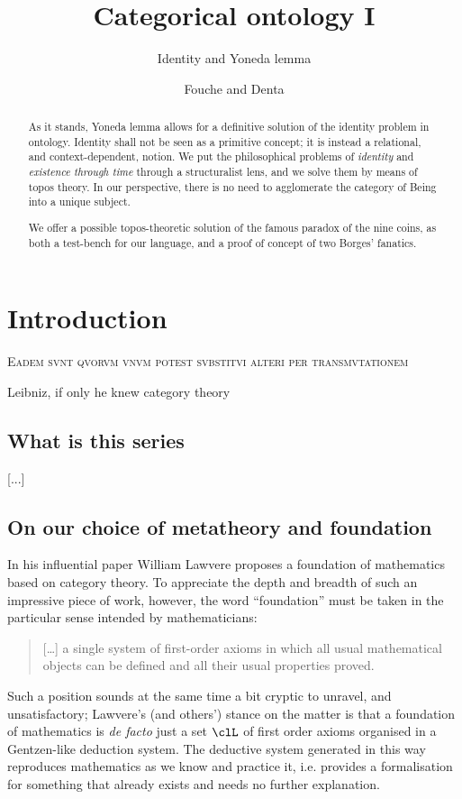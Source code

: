 \documentclass{amsart}
\author{Fouche and Denta}
\title{Categorical ontology I}
\subtitle{Identity and Yoneda lemma}
\begin{document}
\maketitle
\begin{abstract}
  As it stands, Yoneda lemma allows for a definitive solution of the identity problem in ontology. Identity shall not be seen as a primitive concept; it is instead a relational, and context-dependent, notion. We put the philosophical problems of \emph{identity} and \emph{existence through time} through a structuralist lens, and we solve them by means of topos theory. In our perspective, there is no need to agglomerate the category of Being into a unique subject.
  
  We offer a possible topos-theoretic solution of the famous paradox of the nine coins, as both a test-bench for our language, and a proof of concept of two Borges' fanatics.
\end{abstract}
\section{Introduction}
\epigraph{\textsc{Eadem svnt qvorvm vnvm potest svbstitvi alteri per transmvtationem}}{Leibniz, if only he knew category theory}
\subsection{What is this series}
[...]
\subsection{On our choice of metatheory and foundation}
In his influential paper \cite{} William Lawvere proposes a foundation of mathematics based on category theory. To appreciate the depth and breadth of such an impressive piece of work, however, the word ``foundation'' must be taken in the particular sense intended by mathematicians:
\begin{quote}
  [\dots\unkern] a single system of first-order axioms in which all usual mathematical objects can be defined and all their usual properties proved.
\end{quote}
Such a position sounds at the same time a bit cryptic to unravel, and unsatisfactory; Lawvere's (and others') stance on the matter is that a foundation of mathematics is \emph{de facto} just a set $\clL$ of first order axioms organised in a Gentzen-like deduction system. The deductive system generated in this way reproduces mathematics as we know and practice it, i.e. provides a formalisation for something that already exists and needs no further explanation.
\end{document}
